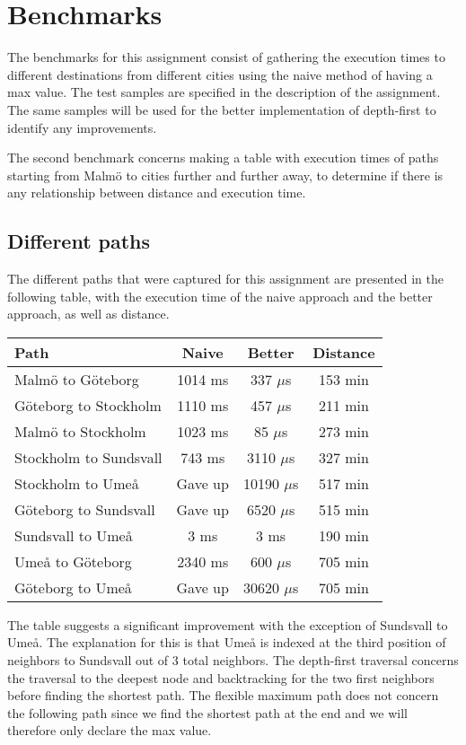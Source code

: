 \documentclass[a4paper,11pt]{article}
\begin{document}
\section*{Benchmarks}

    The benchmarks for this assignment consist of gathering the execution times to different destinations from different cities using the naive method of having a max value. The test samples are specified in the description of the assignment. The same samples will be used for the better implementation of depth-first to identify any improvements. 
    
    The second benchmark concerns making a table with execution times of paths starting from Malmö to cities further and further away, to determine if there is any relationship between distance and execution time.

    \subsection*{Different paths}

        The different paths that were captured for this assignment are presented in the following table, with the execution time of the naive approach and the better approach, as well as distance.
        \begin{table}[h]
        \begin{center}
        \begin{tabular}{l|c|c|c}
        \textbf{Path} & \textbf{Naive} & \textbf{Better} & \textbf{Distance} \\
        \hline
        Malmö to Göteborg      & 1014 ms & 337 $\mu$s   & 153 min\\
        Göteborg to Stockholm  & 1110 ms & 457 $\mu$s   & 211 min\\
        Malmö to Stockholm     & 1023 ms & 85 $\mu$s    & 273 min\\
        Stockholm to Sundsvall & 743 ms  & 3110 $\mu$s  & 327 min\\
        Stockholm to Umeå      & Gave up & 10190 $\mu$s & 517 min\\
        Göteborg to Sundsvall  & Gave up & 6520 $\mu$s  & 515 min\\
        Sundsvall to Umeå      & 3 ms    & 3 ms         & 190 min\\
        Umeå to Göteborg       & 2340 ms & 600 $\mu$s   & 705 min\\
        Göteborg to Umeå       & Gave up & 30620 $\mu$s & 705 min\\
        \end{tabular}
        \end{center}
        \end{table}
        The table suggests a significant improvement with the exception of Sundsvall to Umeå. The explanation for this is that Umeå is indexed at the third position of neighbors to Sundsvall out of 3 total neighbors. The depth-first traversal concerns the traversal to the deepest node and backtracking for the two first neighbors before finding the shortest path. The flexible maximum path does not concern the following path since we find the shortest path at the end and we will therefore only declare the max value.
        
\end{document}
